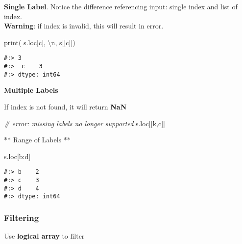 \documentclass[
]{book}
\newenvironment{Shaded}{\begin{snugshade}}{\end{snugshade}}
\newcommand{\BuiltInTok}[1]{#1}
\newcommand{\CharTok}[1]{\textcolor[rgb]{0.5,0.5,0.5}{#1}}
\newcommand{\CommentTok}[1]{\textcolor[rgb]{0.37,0.37,0.37}{\textit{#1}}}
\newcommand{\NormalTok}[1]{#1}
\newcommand{\StringTok}[1]{\textcolor[rgb]{0.5,0.5,0.5}{#1}}
\begin{document}
\textbf{Single Label}. Notice the difference referencing input: single index and list of index.\\
\textbf{Warning}: if index is invalid, this will result in error.

\begin{Shaded}
\begin{Highlighting}[]
\BuiltInTok{print}\NormalTok{( s.loc[}\StringTok{\textquotesingle{}c\textquotesingle{}}\NormalTok{], }\StringTok{\textquotesingle{}}\CharTok{\textbackslash{}n}\StringTok{\textquotesingle{}}\NormalTok{,}
\NormalTok{       s[[}\StringTok{\textquotesingle{}c\textquotesingle{}}\NormalTok{]])}
\end{Highlighting}
\end{Shaded}

\begin{verbatim}
#:> 3 
#:>  c    3
#:> dtype: int64
\end{verbatim}

\textbf{Multiple Labels}

If index is not found, it will return \textbf{NaN}

\begin{Shaded}
\begin{Highlighting}[]
\CommentTok{\# error: missing labels no longer supported}
\NormalTok{s.loc[[}\StringTok{\textquotesingle{}k\textquotesingle{}}\NormalTok{,}\StringTok{\textquotesingle{}c\textquotesingle{}}\NormalTok{]]}
\end{Highlighting}
\end{Shaded}

** Range of Labels **

\begin{Shaded}
\begin{Highlighting}[]
\NormalTok{s.loc[}\StringTok{\textquotesingle{}b\textquotesingle{}}\NormalTok{:}\StringTok{\textquotesingle{}d\textquotesingle{}}\NormalTok{]}
\end{Highlighting}
\end{Shaded}

\begin{verbatim}
#:> b    2
#:> c    3
#:> d    4
#:> dtype: int64
\end{verbatim}

\hypertarget{filtering}{%
\subsubsection{Filtering}\label{filtering}}

Use \textbf{logical array} to filter
\end{document}
